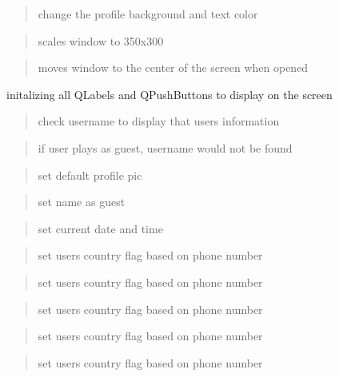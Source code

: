 \begin{quote}
change the profile background and text color \end{quote}


\begin{quote}
scales window to 350x300 \end{quote}


\begin{quote}
moves window to the center of the screen when opened \end{quote}


initalizing all Q\+Labels and Q\+Push\+Buttons to display on the screen

\begin{quote}
check username to display that user\textquotesingle{}s information \end{quote}


\begin{quote}
if user plays as guest, username would not be found \end{quote}


\begin{quote}
set default profile pic \end{quote}


\begin{quote}
set name as guest \end{quote}


\begin{quote}
set current date and time \end{quote}


\begin{quote}
set user\textquotesingle{}s country flag based on phone number \end{quote}


\begin{quote}
set user\textquotesingle{}s country flag based on phone number \end{quote}


\begin{quote}
set user\textquotesingle{}s country flag based on phone number \end{quote}


\begin{quote}
set user\textquotesingle{}s country flag based on phone number \end{quote}


\begin{quote}
set user\textquotesingle{}s country flag based on phone number \end{quote}


